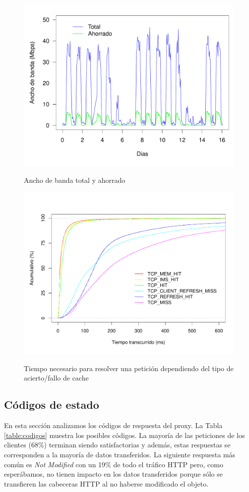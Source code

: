 \documentclass[twocolumn]{Jornadas}
\begin{document}
\begin{figure}[ht!]
\includegraphics[scale=0.29]{figures/Bandwidth_full.pdf}\label{fig:ahorrado}
\caption{Ancho de banda total y ahorrado}
\label{fig:ahorrado}
\end{figure}

\begin{figure}[ht!]
\includegraphics[scale=0.30]{figures/ElapsedTimeAll_1k_full.pdf} \label{fig:elapsed}
\caption{Tiempo necesario para resolver una petición dependiendo del tipo de acierto/fallo de cache}
\label{fig:elapsed}
\end{figure}

\subsection{Códigos de estado}
En esta sección analizamos los códigos de respuesta del proxy. La Tabla \ref{table:codigos} muestra los posibles códigos. La mayoría de las peticiones de los clientes (68\%) terminan siendo satisfactorias y además, estas respuestas se corresponden a la mayoría de datos transferidos. La siguiente respuesta más común es \textit{Not Modified} con un 19\% de todo el tráfico HTTP pero, como esperábamos, no tienen impacto en los datos transferidos porque sólo se transfieren las cabeceras HTTP al no haberse modificado el objeto.
\end{document}
